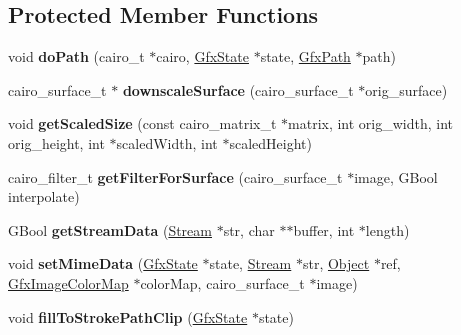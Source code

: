 \subsection*{Protected Member Functions}
\begin{DoxyCompactItemize}
\item 
\mbox{\label{class_cairo_output_dev_aea03b660fb0a6a69bea27723d5af7a00}} 
void {\bfseries do\+Path} (cairo\+\_\+t $\ast$cairo, \hyperlink{class_gfx_state}{Gfx\+State} $\ast$state, \hyperlink{class_gfx_path}{Gfx\+Path} $\ast$path)
\item 
\mbox{\label{class_cairo_output_dev_a90eeeccc19d5189f3dd5152f70d44d68}} 
cairo\+\_\+surface\+\_\+t $\ast$ {\bfseries downscale\+Surface} (cairo\+\_\+surface\+\_\+t $\ast$orig\+\_\+surface)
\item 
\mbox{\label{class_cairo_output_dev_aa0236d1c15e2d04792f296373d653c49}} 
void {\bfseries get\+Scaled\+Size} (const cairo\+\_\+matrix\+\_\+t $\ast$matrix, int orig\+\_\+width, int orig\+\_\+height, int $\ast$scaled\+Width, int $\ast$scaled\+Height)
\item 
\mbox{\label{class_cairo_output_dev_aa057144b1daa02b6df4112a045bb2b63}} 
cairo\+\_\+filter\+\_\+t {\bfseries get\+Filter\+For\+Surface} (cairo\+\_\+surface\+\_\+t $\ast$image, G\+Bool interpolate)
\item 
\mbox{\label{class_cairo_output_dev_a59d9324b7a26d9b3494342fb02be154d}} 
G\+Bool {\bfseries get\+Stream\+Data} (\hyperlink{class_stream}{Stream} $\ast$str, char $\ast$$\ast$buffer, int $\ast$length)
\item 
\mbox{\label{class_cairo_output_dev_a38cdb1ba41bb610c72bc64d251cb4a18}} 
void {\bfseries set\+Mime\+Data} (\hyperlink{class_gfx_state}{Gfx\+State} $\ast$state, \hyperlink{class_stream}{Stream} $\ast$str, \hyperlink{class_object}{Object} $\ast$ref, \hyperlink{class_gfx_image_color_map}{Gfx\+Image\+Color\+Map} $\ast$color\+Map, cairo\+\_\+surface\+\_\+t $\ast$image)
\item 
\mbox{\label{class_cairo_output_dev_aaafb4eeefad11b36474090d188f0b058}} 
void {\bfseries fill\+To\+Stroke\+Path\+Clip} (\hyperlink{class_gfx_state}{Gfx\+State} $\ast$state)
$$
\end{DoxyCompactItemize}
